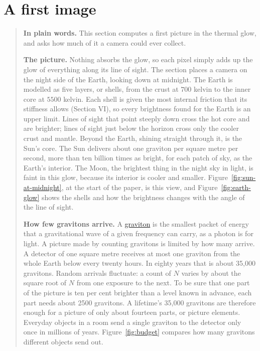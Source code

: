 \section{A first image}\label{sec:first-image}

\begin{quote}
\textbf{In plain words.} This section computes a first picture in the thermal
glow, and asks how much of it a camera could ever collect.

\textbf{The picture.} Nothing absorbs the glow, so each pixel simply adds up the
glow of everything along its line of sight. The section places a camera on the
night side of the Earth, looking down at midnight. The Earth is modelled as five
layers, or shells, from the crust at $700$ kelvin to the inner core at $5500$
kelvin. Each shell is given the most internal friction that its stiffness
allows (Section VI), so every brightness found for the Earth is an upper limit.
Lines of sight that point steeply down cross the hot core and are brighter;
lines of sight just below the horizon cross only the cooler crust and mantle.
Beyond the Earth, shining straight through it, is the Sun's core. The Sun
delivers about one graviton per square metre per second, more than ten billion
times as bright, for each patch of sky, as the Earth's interior. The Moon,
the brightest thing in the night sky in light, is faint in this glow, because
its interior is cooler and smaller. Figure~\ref{fig:sun-at-midnight}, at the start of the paper, is this view, and Figure~\ref{fig:earth-glow} shows the shells and how the brightness changes with the angle of the line of sight.

\textbf{How few gravitons arrive.} A
\href{https://en.wikipedia.org/wiki/Graviton}{graviton} is the smallest
packet of energy that a gravitational wave of a given frequency can carry, as a photon is for light. A picture made by
counting gravitons is limited by how many arrive. A detector of one square
metre receives at most one graviton from the whole Earth below every twenty
hours. In eighty years that is about 35,000 gravitons. Random arrivals
fluctuate: a count of $N$ varies by about the square root of $N$ from one
exposure to the next. To be sure that one part of the picture is ten per cent
brighter than a level known in advance, each part needs about 2500 gravitons. A lifetime's
35,000 gravitons are therefore enough for a picture of only about fourteen
parts, or picture elements. Everyday objects in a room send a single graviton to
the detector only once in millions of years. Figure~\ref{fig:budget} compares how many gravitons different objects send out.


\end{quote}
